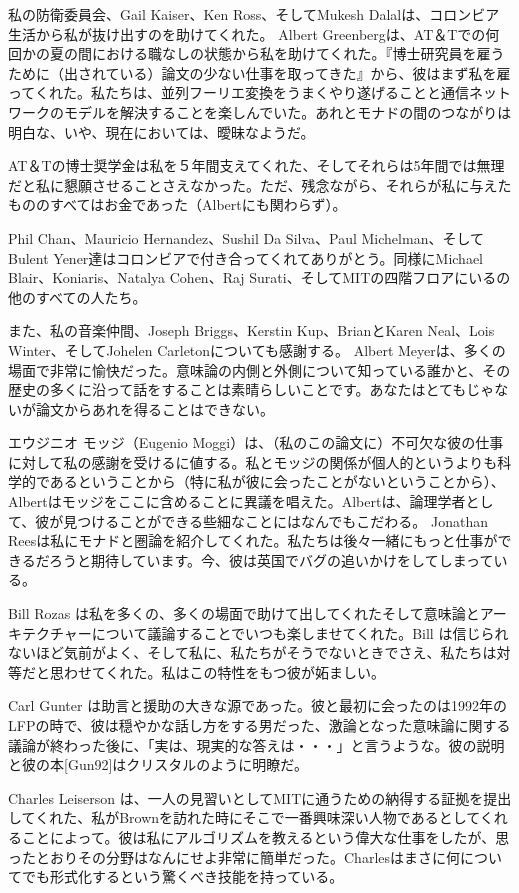 \documentclass[11pt, oneside]{jsbook}   	%
\begin{document}
私の防衛委員会、Gail Kaiser、Ken Ross、そしてMukesh Dalalは、コロンビア生活から私が抜け出すのを助けてくれた。
Albert Greenbergは、AT＆Tでの何回かの夏の間における職なしの状態から私を助けてくれた。『博士研究員を雇うために（出されている）論文の少ない仕事を取ってきた』から、彼はまず私を雇ってくれた。私たちは、並列フーリエ変換をうまくやり遂げることと通信ネットワークのモデルを解決することを楽しんでいた。あれとモナドの間のつながりは明白な、いや、現在においては、曖昧なようだ。

AT＆Tの博士奨学金は私を５年間支えてくれた、そしてそれらは5年間では無理だと私に懇願させることさえなかった。ただ、残念ながら、それらが私に与えたもののすべてはお金であった（Albertにも関わらず）。

Phil Chan、Mauricio Hernandez、Sushil Da Silva、Paul Michelman、そしてBulent Yener達はコロンビアで付き合ってくれてありがとう。同様にMichael Blair、Koniaris、Natalya Cohen、Raj Surati、そしてMITの四階フロアにいるの他のすべての人たち。

また、私の音楽仲間、Joseph Briggs、Kerstin Kup、BrianとKaren Neal、Lois Winter、そしてJohelen Carletonについても感謝する。
Albert Meyerは、多くの場面で非常に愉快だった。意味論の内側と外側について知っている誰かと、その歴史の多くに沿って話をすることは素晴らしいことです。あなたはとてもじゃないが論文からあれを得ることはできない。

エウジニオ モッジ（Eugenio Moggi）は、（私のこの論文に）不可欠な彼の仕事に対して私の感謝を受けるに値する。私とモッジの関係が個人的というよりも科学的であるということから（特に私が彼に会ったことがないということから）、Albertはモッジをここに含めることに異議を唱えた。Albertは、論理学者として、彼が見つけることができる些細なことにはなんでもこだわる。
\newpage
Jonathan Reesは私にモナドと圏論を紹介してくれた。私たちは後々一緒にもっと仕事ができるだろうと期待しています。今、彼は英国でバグの追いかけをしてしまっている。

Bill Rozas は私を多くの、多くの場面で助けて出してくれたそして意味論とアーキテクチャーについて議論することでいつも楽しませてくれた。Bill は信じられないほど気前がよく、そして私に、私たちがそうでないときでさえ、私たちは対等だと思わせてくれた。私はこの特性をもつ彼が妬ましい。

Carl Gunter は助言と援助の大きな源であった。彼と最初に会ったのは1992年のLFPの時で、彼は穏やかな話し方をする男だった、激論となった意味論に関する議論が終わった後に、「実は、現実的な答えは・・・」と言うような。彼の説明と彼の本[Gun92]はクリスタルのように明瞭だ。

Charles Leiserson は、一人の見習いとしてMITに通うための納得する証拠を提出してくれた、私がBrownを訪れた時にそこで一番興味深い人物であるとしてくれることによって。彼は私にアルゴリズムを教えるという偉大な仕事をしたが、思ったとおりその分野はなんにせよ非常に簡単だった。Charlesはまさに何についてでも形式化するという驚くべき技能を持っている。
\end{document}

